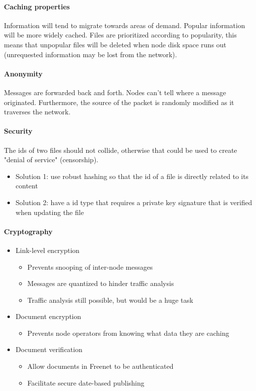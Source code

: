 \documentclass[10pt,a4paper]{article}
\begin{document}
\paragraph{Caching properties}
Information will tend to migrate towards areas of demand. Popular information will be more widely cached. Files are prioritized according to popularity, this means that unpopular files will be deleted when node disk space runs out (unrequested information may be lost from the network). 
\paragraph{Anonymity}
Messages are forwarded back and forth. Nodes can't tell where a message originated. Furthermore, the source of the packet is randomly modified as it traverses the network. 
\paragraph{Security}
The ids of two files should not collide, otherwise that could be used to create "denial of service" (censorship). 
\begin{itemize}
	\item Solution 1: use robust hashing so that the id of a file is directly related to its content
	\item Solution 2: have a id type that requires a private key signature that is verified when updating the file
\end{itemize}
\paragraph{Cryptography}
\begin{itemize}
	\item Link-level encryption
	\begin{itemize}
		\item Prevents snooping of inter-node messages
		\item Messages are quantized to hinder traffic analysis
		\item Traffic analysis still possible, but would be a huge task
	\end{itemize}
	\item Document encryption
	\begin{itemize}
		\item Prevents node operators from knowing what data they are caching
	\end{itemize}
	\item Document verification
	\begin{itemize}
		\item Allow documents in Freenet to be authenticated
		\item Facilitate secure date-based publishing
	\end{itemize}
\end{itemize}
\end{document}
